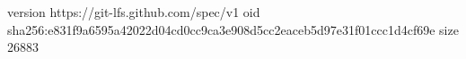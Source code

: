 version https://git-lfs.github.com/spec/v1
oid sha256:e831f9a6595a42022d04cd0cc9ca3e908d5cc2eaceb5d97e31f01ccc1d4cf69e
size 26883
